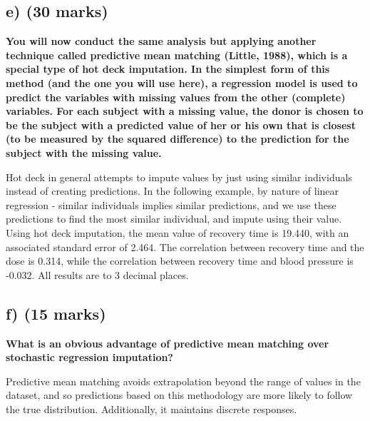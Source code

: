 \documentclass{article}
\numberwithin{equation}{section} %
\begin{document}
\subsection*{e) (30 marks)}
\textbf{You will now conduct the same analysis but applying another technique called predictive mean matching (Little, 1988), which is a special type of hot deck imputation. In the simplest form of this method (and the one you will use here), a regression model is used to predict the variables with missing values from the other (complete) variables. For each subject with a missing value, the donor is chosen to be the subject with a predicted value of her or his own that is closest (to be measured by the squared difference) to the prediction for the subject with the missing value.}


\vspace{5mm}
Hot deck in general attempts to impute values by just using similar individuals instead of creating predictions. In the following example, by nature of linear regression - similar individuals implies similar predictions, and we use these predictions to find the most similar individual, and impute using their value. \\

Using hot deck imputation, the mean value of recovery time is 19.440, with an associated standard error of 2.464. The correlation between recovery time and the dose is 0.314, while the correlation between recovery time and blood pressure is -0.032. All results are to 3 decimal places. 


\subsection*{f) (15 marks)}
\textbf{What is an obvious advantage of predictive mean matching over stochastic regression imputation?}

Predictive mean matching avoids extrapolation beyond the range of values in the dataset, and so predictions based on this methodology are more likely to follow the true distribution. Additionally, it maintains discrete responses. 

\newpage
\appendix
\end{document}
